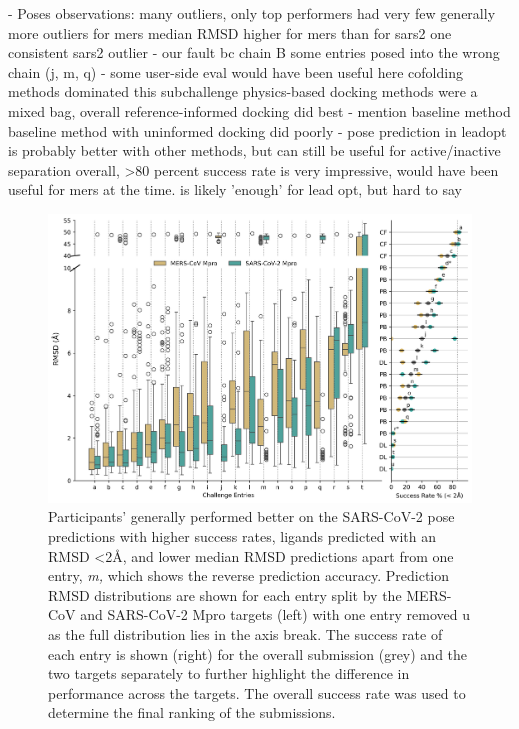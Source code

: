 \documentclass[journal=jacsat,manuscript=article]{achemso}
\begin{document}
- Poses
observations:
many outliers, only top performers had very few
generally more outliers for mers
median RMSD higher for mers than for sars2
one consistent sars2 outlier - our fault bc chain B
some entries posed into the wrong chain (j, m, q) - some user-side eval would have been useful here
cofolding methods dominated this subchallenge
physics-based docking methods were a mixed bag, overall reference-informed docking did best - mention baseline method
baseline method with uninformed docking did poorly - pose prediction in leadopt is probably better with other methods, but can still be useful for active/inactive separation
overall, >80 percent success rate is very impressive, would have been useful for mers at the time. is likely 'enough' for lead opt, but hard to say
\begin{figure}
    \includegraphics[scale=0.15
    ]{04_figs_leaderboards/pose_comp.png}
  \caption{Participants' generally performed better on the SARS-CoV-2 pose predictions with higher success rates, ligands predicted with an RMSD \textless2Å, and lower median RMSD predictions apart from one entry, \textit{m,} which shows the reverse prediction accuracy. Prediction RMSD distributions are shown for each entry split by the MERS-CoV and SARS-CoV-2 Mpro targets (left) with one entry removed u as the full distribution lies in the axis break. The success rate of each entry is shown (right) for the overall submission (grey) and the two targets separately to further highlight the difference in performance across the targets. The overall success rate was used to determine the final ranking of the submissions.}
  \label{fgr:poses_leaderboard}
\end{figure}
\end{document}
